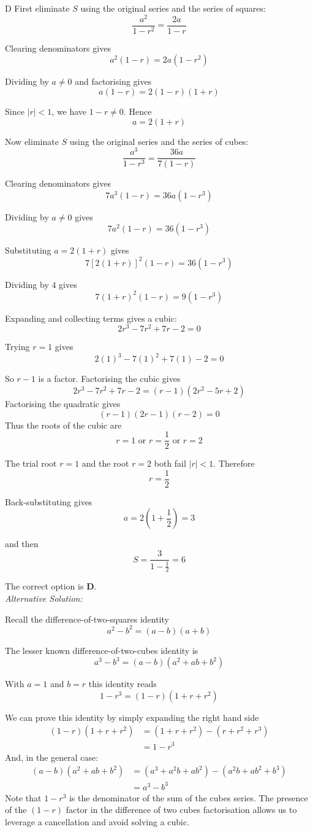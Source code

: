 \documentclass[11pt,a4paper]{article}
\begin{document}
\begin{enumerate}[label=\textbf{\arabic*.},leftmargin=*,itemsep=0pt,start=1]
\begin{djsSolution}{D}
First eliminate $S$ using the original series and the series of squares:
\[
\frac{a^2}{1-r^2}=\frac{2a}{1-r}
\]

Clearing denominators gives
\[
a^2(1-r)=2a(1-r^2)
\]

Dividing by $a\ne0$ and factorising gives
\[
a(1-r)=2(1-r)(1+r)
\]

Since $|r|<1$, we have $1-r\ne0$. Hence
\[
a=2(1+r)
\]

Now eliminate $S$ using the original series and the series of cubes:
\[
\frac{a^3}{1-r^3}=\frac{36a}{7(1-r)}
\]

Clearing denominators gives
\[
7a^3(1-r)=36a(1-r^3)
\]

Dividing by $a\ne0$ gives
\[
7a^2(1-r)=36(1-r^3)
\]

Substituting $a=2(1+r)$ gives
\[
7[2(1+r)]^2(1-r)=36(1-r^3)
\]

Dividing by $4$ gives
\[
7(1+r)^2(1-r)=9(1-r^3)
\]

Expanding and collecting terms gives a cubic:
\[
2r^3-7r^2+7r-2=0
\]

Trying $r=1$ gives
\[
2(1)^3-7(1)^2+7(1)-2=0
\]

So $r-1$ is a factor. Factorising the cubic gives
\[
2r^3-7r^2+7r-2=(r-1)(2r^2-5r+2)
\]
Factorising the quadratic gives
\[
(r-1)(2r-1)(r-2)=0
\]
Thus the roots of the cubic are
\[
r=1\text{ or }r=\frac12\text{ or }r=2
\]

The trial root $r=1$ and the root $r=2$ both fail $|r|<1$. Therefore
\[
r=\frac12
\]

Back-substituting gives
\[
a=2\left(1+\frac12\right)=3
\]

and then
\[
S=\frac{3}{1-\frac12}=6
\]

The correct option is \textbf{D}.\\[5pt]

\textit{Alternative Solution:}

Recall the difference-of-two-squares identity
\[a^2-b^2 = (a-b)(a+b)\]

The lesser known difference-of-two-cubes identity is
\[a^3-b^3=(a-b)(a^2+ab+b^2)\]

With $a=1$ and $b=r$ this identity reads
\[ 1 - r^3 = (1-r)(1+r+r^2)\]

We can prove this identity by simply expanding the right hand side
\begin{align*}
    (1-r)(1+r+r^2) &= (1 + r + r^2) - (r + r^2 + r^3) \\[5pt]
                   &= 1-r^3
\end{align*}
And, in the general case:
\begin{align*}
    (a-b)(a^2+ab+b^2) &= (a^3 + a^2b + ab^2) - (a^2b + ab^2 + b^3) \\[5pt]
                   &= a^3-b^3
\end{align*}
Note that $1-r^3$ is the denominator of the sum of the cubes series. The presence of the $(1-r)$ factor in the difference of two cubes factorisation allows us to leverage a cancellation and avoid solving a cubic.


\end{djsSolution}
\end{enumerate}
\end{document}
